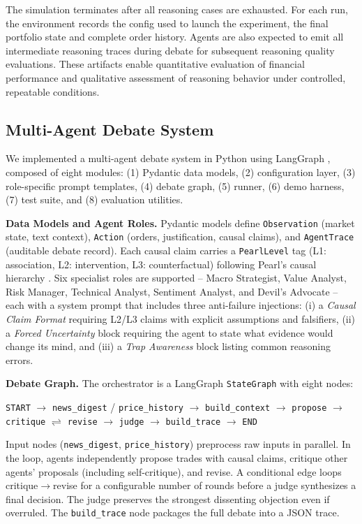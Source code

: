 \documentclass{article}
\begin{document}
The simulation terminates after all reasoning cases are exhausted. For each run, the environment records the config used to launch the experiment, the final portfolio state and complete order history. Agents are also expected to emit all intermediate reasoning traces during debate for subsequent reasoning quality evaluations. These artifacts enable quantitative evaluation of financial performance and qualitative assessment of reasoning behavior under controlled, repeatable conditions.

\subsection{Multi-Agent Debate System}

We implemented a multi-agent debate system in Python using LangGraph \citep{langgraph}, composed of eight modules: (1) Pydantic data models, (2) configuration layer, (3) role-specific prompt templates, (4) debate graph, (5) runner, (6) demo harness, (7) test suite, and (8) evaluation utilities.

\textbf{Data Models and Agent Roles.}
Pydantic models define \texttt{Observation} (market state, text context), \texttt{Action} (orders, justification, causal claims), and \texttt{AgentTrace} (auditable debate record). Each causal claim carries a \texttt{PearlLevel} tag (L1: association, L2: intervention, L3: counterfactual) following Pearl's causal hierarchy \citep{pearl2009causality}. Six specialist roles are supported -- Macro Strategist, Value Analyst, Risk Manager, Technical Analyst, Sentiment Analyst, and Devil's Advocate -- each with a system prompt that includes three anti-failure injections: (i) a \emph{Causal Claim Format} requiring L2/L3 claims with explicit assumptions and falsifiers, (ii) a \emph{Forced Uncertainty} block requiring the agent to state what evidence would change its mind, and (iii) a \emph{Trap Awareness} block listing common reasoning errors.

\textbf{Debate Graph.}
The orchestrator is a LangGraph \texttt{StateGraph} with eight nodes:

\begin{center}
\texttt{START} $\to$ \texttt{news\_digest} / \texttt{price\_history} $\to$ \texttt{build\_context} $\to$ \texttt{propose} $\to$ \texttt{critique} $\rightleftharpoons$ \texttt{revise} $\to$ \texttt{judge} $\to$ \texttt{build\_trace} $\to$ \texttt{END}
\end{center}

Input nodes (\texttt{news\_digest}, \texttt{price\_history}) preprocess raw inputs in parallel. In the loop, agents independently propose trades with causal claims, critique other agents' proposals (including self-critique), and revise. A conditional edge loops critique$\to$revise for a configurable number of rounds before a judge synthesizes a final decision. The judge preserves the strongest dissenting objection even if overruled. The \texttt{build\_trace} node packages the full debate into a JSON trace.
\end{document}
